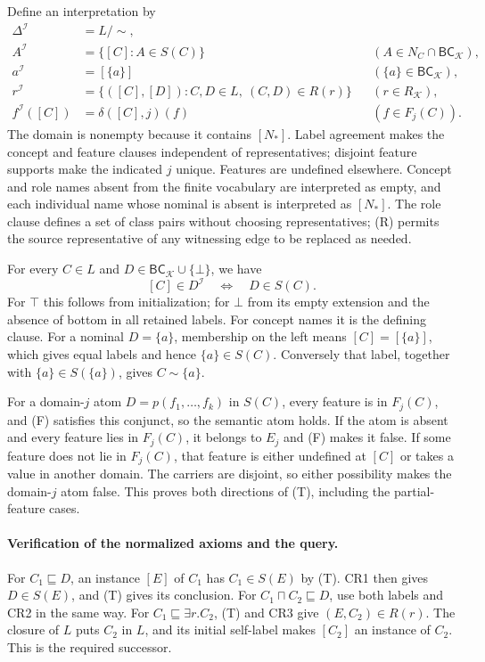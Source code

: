 Define an interpretation by
\[
\begin{aligned}
 \Delta^{\mathcal I}&=L/{\sim},\\
 A^{\mathcal I}&=\{[C]:A\in S(C)\}
       &&(A\in N_C\cap\mathsf{BC}_{\mathcal K}),\\
 a^{\mathcal I}&=[\{a\}]
       &&(\{a\}\in\mathsf{BC}_{\mathcal K}),\\
 r^{\mathcal I}&=\{([C],[D]):C,D\in L,\ (C,D)\in R(r)\}
       &&(r\in R_{\mathcal K}),\\
 f^{\mathcal I}([C])&=\delta([C],j)(f)
       &&(f\in F_j(C)).
\end{aligned}
\]
The domain is nonempty because it contains \([N_\ast]\).
Label agreement makes the concept and feature clauses independent of
representatives; disjoint feature supports make the indicated \(j\) unique.
Features are undefined elsewhere.  Concept and role names absent from the
finite vocabulary are interpreted as empty, and each individual name whose
nominal is absent is interpreted as \([N_\ast]\).  The role clause defines
a set of class pairs without choosing representatives; (R) permits the
source representative of any witnessing edge to be replaced as needed.

For every \(C\in L\) and \(D\in\mathsf{BC}_{\mathcal K}\cup\{\bot\}\), we have
\[
 [C]\in D^{\mathcal I}\quad\Longleftrightarrow\quad D\in S(C).
 \tag{T}
\]
For \(\top\) this follows from initialization; for \(\bot\) from its
empty extension and the absence of bottom in all retained labels.
For concept names it is the defining clause.
For a nominal \(D=\{a\}\), membership on the left means
\([C]=[\{a\}]\), which gives equal labels and hence
\(\{a\}\in S(C)\).  Conversely that label, together with
\(\{a\}\in S(\{a\})\), gives \(C\sim\{a\}\).

For a domain-\(j\) atom \(D=p(f_1,\ldots,f_k)\) in \(S(C)\),
every feature is in \(F_j(C)\), and (F) satisfies this conjunct, so the
semantic atom holds.  If the atom is absent and every feature lies in
\(F_j(C)\), it belongs to \(E_j\) and (F) makes it false.
If some feature does not lie in \(F_j(C)\), that feature is either
undefined at \([C]\) or takes a value in another domain.  The carriers
are disjoint, so either possibility makes the domain-\(j\) atom false.
This proves both directions of (T), including the partial-feature cases.

\paragraph{Verification of the normalized axioms and the query.}
For \(C_1\sqsubseteq D\), an instance \([E]\) of \(C_1\) has
\(C_1\in S(E)\) by (T).  CR1 then gives \(D\in S(E)\), and (T)
gives its conclusion.  For \(C_1\sqcap C_2\sqsubseteq D\), use both
labels and CR2 in the same way.
For \(C_1\sqsubseteq\exists r.C_2\), (T) and CR3 give
\((E,C_2)\in R(r)\).  The closure of \(L\) puts \(C_2\) in \(L\),
and its initial self-label makes \([C_2]\) an instance of \(C_2\).
This is the required successor.

